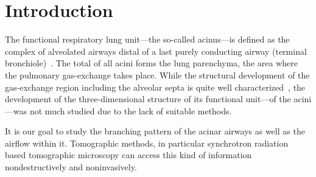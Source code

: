 \documentclass[preprint,s]{iucr}
\begin{document}
\begin{abstract}
Volumetric data at micrometer level can be acquired within a few minutes using synchrotron radiation based tomographic microscopy. The field of view can be easily increased along the rotation axis of the sample by stacking several tomograms, which allows to investigate long and thin objects at high resolution. This paper presents an acquisition protocol which increases the field of view of the tomographic dataset perpendicular to its rotation axis. The acquisition protocol can be tuned as a function of the reconstruction quality and scanning time. Since the scanning time is proportional to the radiation dose imparted to the sample, this method can be used to increase the field of view of tomographic microscopy instruments while optimizing the radiation dose for radiation sensitive samples and keeping the quality of the tomographic dataset on the required level.

This approach, dubbed wide field synchrotron radiation tomographic microscopy, can increase the lateral field of view up to five times. The method has been successfully applied for the three-dimensional imaging of entire rat lung acini with a diameter of \SI{4.1}{\milli\meter} at a voxel size of \SI{1.48}{\micro\meter}.
\end{abstract}
\section{Introduction}
The functional respiratory lung unit---the so-called acinus---is defined as the complex of alveolated airways distal of a last purely conducting airway (terminal bronchiole)~\cite{Rodriguez1987}. The total of all acini forms the lung parenchyma, the area where the pulmonary gas-exchange takes place. While the structural development of the gas-exchange region including the alveolar septa is quite well characterized~\cite{Schittny2007a,Schittny2008,Mund2008}, the development of the three-dimensional structure of its functional unit---of the acini---was not much studied due to the lack of suitable methods. 

It is our goal to study the branching pattern of the acinar airways as well as the airflow within it. Tomographic methods, in particular synchrotron radiation based tomographic microscopy can access this kind of information nondestructively and noninvasively.
\end{document}
